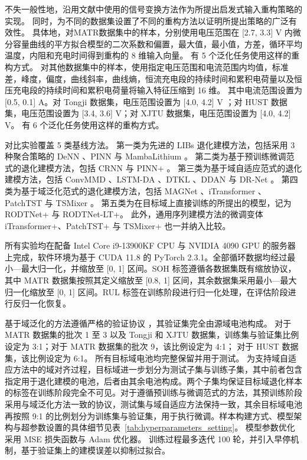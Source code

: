 不失一般性地，沿用文献\cite{10251604, wang2024physics}中使用的信号变换方法作为所提出启发式输入重构策略的实现。
同时，为不同的数据集设置了不同的重构方法以证明所提出策略的广泛有效性。
具体地，对MATR数据集中的样本，分别使用电压范围在 [2.7, 3.3] V 内微分容量曲线的平方拟合模型的二次系数和偏置，最大值，最小值，方差，循环平均温度，内阻和充电时间得到重构的 8 维输入向量。
% 
有 5 个泛化任务使用这样的重构方式。
% 
对其他数据集中的样本，使用指定电压范围和电流范围内均值，标准差，峰度，偏度，曲线斜率，曲线熵，恒流充电段的持续时间和累积电荷量以及恒压充电段的持续时间和累积电荷量将输入特征压缩到 16 维。
其中电流范围设置为 [0.5, 0.1] A。对 Tongji 数据集，电压范围设置为 [4.0, 4.2] V ；对 HUST 数据集，电压范围设置为 [3.4, 3.6] V；对 XJTU 数据集，电压范围设置为 [4.0, 4.2] V。
有 6 个泛化任务使用这样的重构方式。

对比实验覆盖 5 类基线方法。
% 
第一类为先进的 LIBs 退化建模方法，包括采用 3 种聚合策略的 DeNN \cite{10102497}、PINN \cite{wang2024physics} 与 MambaLithium \cite{shi2024mambalithium}。
% 
第二类为基于预训练微调范式的退化建模方法，包括 CRNN \cite{D2EE01676A} 与 PINN+ \cite{wang2024physics}。
% 
第三类为基于域自适应范式的退化建模方法，包括 ConvMMD \cite{9788003}、LSTM-DA \cite{HAN2022230823}、DTKL \cite{10029904}、DDAN \cite{9560040} 与 DR-Net \cite{WANG2023108897}。
% 
第四类为基于域泛化范式的退化建模方法，包括 MAGNet \cite{TAN2024103725}、iTransformer \cite{liu2024itransformer}、PatchTST \cite{nie2023a} 与 TSMixer \cite{chen2023tsmixer}。
% 
第五类为在目标域上直接训练的所提出的模型，记为 RODTNet+ 与 RODTNet-LT+。
此外，通用序列建模方法的微调变体 iTransformer+、PatchTST+ 与 TSMixer+ 也一并纳入比较。

所有实验均在配备 Intel Core i9-13900KF CPU 与 NVIDIA 4090 GPU 的服务器上完成，软件环境为基于 CUDA 11.8 的 PyTorch 2.3.1。全部循环数据均经过最小—最大归一化，并缩放至 [0, 1] 区间。SOH 标签遵循各数据集既有缩放协议，其中 MATR 数据集按照其定义缩放至 [0.8, 1] 区间，其余数据集采用最小—最大归一化缩放至 [0, 1] 区间。RUL 标签在训练阶段进行归一化处理，在评估阶段进行反归一化恢复。

基于域泛化的方法遵循严格的验证协议 \cite{9847099}，其验证集完全由源域电池构成。
对于 MATR 数据集的批次 1 至 3 以及 Tongji 和 XJTU 数据集，训练集与验证集比例设定为 3:1；对于 MATR 数据集的批次 9，该比例设定为 4:1；
对于 HUST 数据集，该比例设定为 6:1。
所有目标域电池均完整保留并用于测试。
为支持域自适应方法中的域对齐过程，目标域进一步划分为测试子集与训练子集，其中前者包含指定用于退化建模的电池，后者由其余电池构成。两个子集均保证目标域退化样本的标签在训练阶段完全不可见。对于遵循预训练与微调范式的方法，其预训练阶段采用与域泛化方法一致的协议，测试集与域自适应方法保持一致，其余目标域电池再按照 9:1 的比例划分为训练集与验证集，用于执行微调。样本构建方式、模型架构与超参数设置的具体细节见表~\ref{tab:hyperparameters_setting}。
% 
模型参数优化采用 MSE 损失函数与 Adam 优化器。
训练过程最多迭代 100 轮，并引入早停机制，基于验证集上的建模误差以抑制过拟合。

